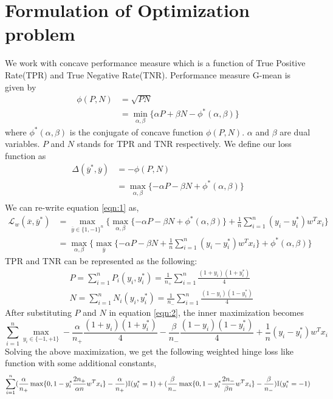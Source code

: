 \documentclass{article} %
\begin{document}
\section{Formulation of Optimization problem}
We work with concave performance measure which is a function of True Positive Rate(TPR) and True Negative Rate(TNR). Performance measure G-mean is given by
\begin{equation*}
\begin{split}
	\phi(P,N) &=\sqrt{PN}\\
	& = \min_{\alpha,\beta}\{\alpha P+\beta N - \phi^*(\alpha,\beta)\}
\end{split}
\end{equation*}
where $\phi^*(\alpha,\beta)$ is the conjugate of concave function $\phi(P,N)$. $\alpha$ and $\beta$ are dual variables. $P$ and $N$ stands for TPR and TNR respectively. We define our loss function as
\begin{equation*}
\begin{split}
	\Delta(\overline{y}^*,\overline{y}) &= -\phi(P,N) \\
	&= \max_{\alpha,\beta}\{-\alpha P-\beta N + \phi^*(\alpha,\beta)\}\\
\end{split}
\end{equation*}
We can re-write equation \ref{eqn:1} as,
\begin{align}
\label{eqn:2}
	\mathcal L_w(\overline{x},\overline{y}^*)\nonumber &=\max_{\overline{y}\in\{1,-1\}^n}\{\max_{\alpha,\beta}\{-\alpha P-\beta N +\phi^*(\alpha,\beta)\} + \frac{1}{n}\sum_{i=1}^n (y_i - y_i^*)w^Tx_i\}\nonumber\\
	&=\max_{\alpha,\beta}\{\max_{\overline{y}}\{-\alpha P-\beta N  + \frac{1}{n}\sum_{i=1}^n (y_i - y_i^*)w^Tx_i\}+\phi^*(\alpha,\beta)\}
\end{align}
TPR and TNR can be represented as the following:
\begin{equation*}
\begin{split}
	&P = \sum_{i=1}^nP_i(y_i,y_i^*)= \frac{1}{n_+}\sum_{i=1}^n\frac{(1+y_i)(1+y_i^*)}{4}\\
	&N = \sum_{i=1}^nN_i(y_i,y_i^*)= \frac{1}{n_-}\sum_{i=1}^n\frac{(1-y_i)(1-y_i^*)}{4}
\end{split}
\end{equation*}
After substituting $P$ and $N$ in equation \ref{eqn:2}, the inner maximization becomes
\begin{equation}
\sum_{i=1}^n\max_{y_i\in\{-1,+1\}}-\frac{\alpha}{n_+}\frac{(1+y_i)(1+y_i^*)}{4} - \frac{\beta}{n_-}\frac{(1-y_i)(1-y_i^*)}{4} + \frac{1}{n}(y_i - y_i^*)w^Tx_i
\end{equation}
Solving the above maximization, we get the following weighted hinge loss like function with some additional constants,
\begin{equation*}
\sum_{i=1}^n
(\frac{\alpha}{n_+}\max\{0,1-y_i^*\frac{2n_+}{\alpha n}w^Tx_i\}
- \frac{\alpha}{n_+})\mathbb{I}(y^*_i=1)\\
+ (\frac{\beta}{n_-}\max\{0,1-y_i^*\frac{2n_-}{\beta n}w^Tx_i\}
- \frac{\beta}{n_-})\mathbb{I}(y^*_i=-1)
\end{equation*}
\end{document}
